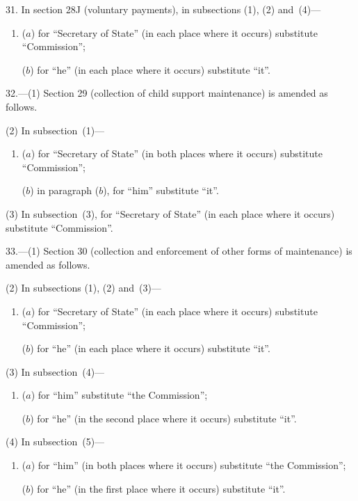 \documentclass[12pt,a4paper]{article}
\begin{document}
\medskip

31. In section 28J (voluntary payments), in subsections (1), (2) and~(4)—
\begin{enumerate}\item[]
($a$) for “Secretary of State” (in each place where it occurs) substitute “Commission”;

($b$) for “he” (in each place where it occurs) substitute “it”.
\end{enumerate}

\medskip

32.---(1) Section 29 (collection of child support maintenance) is amended as follows.

(2) In subsection~(1)—
\begin{enumerate}\item[]
($a$) for “Secretary of State” (in both places where it occurs) substitute “Commission”;

($b$) in paragraph ($b$), for “him” substitute “it”.
\end{enumerate}

(3) In subsection~(3), for “Secretary of State” (in each place where it occurs) substitute “Commission”.

\medskip

33.---(1) Section 30 (collection and enforcement of other forms of maintenance) is amended as follows.

(2) In subsections (1), (2) and~(3)—
\begin{enumerate}\item[]
($a$) for “Secretary of State” (in each place where it occurs) substitute “Commission”;

($b$) for “he” (in each place where it occurs) substitute “it”.
\end{enumerate}

(3) In subsection~(4)—
\begin{enumerate}\item[]
($a$) for “him” substitute “the Commission”;

($b$) for “he” (in the second place where it occurs) substitute “it”.
\end{enumerate}

(4) In subsection~(5)—
\begin{enumerate}\item[]
($a$) for “him” (in both places where it occurs) substitute “the Commission”;

($b$) for “he” (in the first place where it occurs) substitute “it”.
\end{enumerate}
\end{document}

